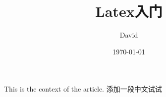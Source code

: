 \documentclass[UTF8]{article}
\title{Latex入门}
\author{David}
\date{\today}
\begin{document}
    \maketitle
    This is the context of the article.
    添加一段中文试试
\end{document}

